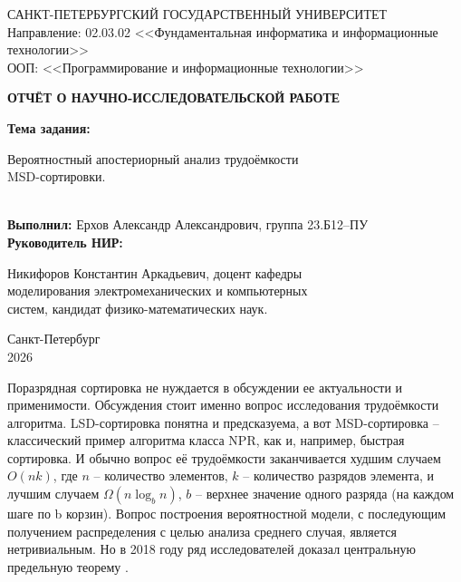 \documentclass[a4paper, 12pt]{article}
\begin{document}
\begin{titlepage}
    \begin{center}
        САНКТ-ПЕТЕРБУРГСКИЙ ГОСУДАРСТВЕННЫЙ УНИВЕРСИТЕТ \\
        Направление: 02.03.02 <<Фундаментальная информатика и информационные технологии>> \\ 
        ООП: <<Программирование и информационные технологии>> 

        \vspace{6cm}
        {\bfseries ОТЧЁТ О НАУЧНО-ИССЛЕДОВАТЕЛЬСКОЙ РАБОТЕ} 
        \vspace{\baselineskip}
        \begin{flushleft}
            {\bfseries Тема задания:} 
                \begin{minipage}[t]{0.8\textwidth}
                    Вероятностный апостериорный анализ трудоёмкости \\MSD-сортировки.
                \end{minipage}\\
            \vspace{\baselineskip}
            {\bfseries Выполнил:} Ерхов Александр Александрович, группа 23.Б12--ПУ \\
            \vspace{\baselineskip}
            {\bfseries Руководитель НИР:} 
                \begin{minipage}[t]{0.7\textwidth}
                    Никифоров Константин Аркадьевич, доцент кафедры \\моделирования электромеханических и компьютерных \\систем, кандидат физико-математических наук.
                \end{minipage}
        \end{flushleft}

        \vspace{\fill}
        Санкт-Петербург \\
        2026
    \end{center}
\end{titlepage}
\addtocounter{page}{1}

\newpage
\tableofcontents

\newpage
{}
Поразрядная сортировка не нуждается в обсуждении ее актуальности и применимости. Обсуждения стоит именно вопрос исследования трудоёмкости алгоритма. LSD-сортировка понятна и предсказуема, а вот MSD-сортировка -- классический пример алгоритма класса NPR, как и, например, быстрая сортировка. И обычно вопрос её трудоёмкости заканчивается худшим случаем $O(nk)$, где $n$ -- количество элементов, $k$ -- количество разрядов элемента, и лучшим случаем $\Omega(n\log_bn)$, $b$ -- верхнее значение одного разряда (на каждом шаге по b корзин). Вопрос построения вероятностной модели, с последующим получением распределения с целью анализа среднего случая, является нетривиальным. Но в 2018 году ряд исследователей доказал центральную предельную теорему \cite{limitth}.
\end{document}
